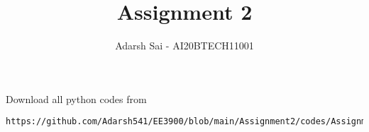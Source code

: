 \documentclass[journal,12pt,twocolumn]{IEEEtran}
\DeclareMathOperator*{\Res}{Res}
\begin{document}
\newcommand{\BEQA}{\begin{eqnarray}}
\newcommand{\EEQA}{\end{eqnarray}}
\newcommand{\define}{\stackrel{\triangle}{=}}

\raggedbottom
\setlength{\parindent}{0pt}
\providecommand{\mbf}{\mathbf}
\providecommand{\pr}[1]{\ensuremath{\Pr\left(#1\right)}}
\providecommand{\qfunc}[1]{\ensuremath{Q\left(#1\right)}}
\providecommand{\sbrak}[1]{\ensuremath{{}\left[#1\right]}}
\providecommand{\lsbrak}[1]{\ensuremath{{}\left[#1\right.}}
\providecommand{\rsbrak}[1]{\ensuremath{{}\left.#1\right]}}
\providecommand{\brak}[1]{\ensuremath{\left(#1\right)}}
\providecommand{\lbrak}[1]{\ensuremath{\left(#1\right.}}
\providecommand{\rbrak}[1]{\ensuremath{\left.#1\right)}}
\providecommand{\cbrak}[1]{\ensuremath{\left\{#1\right\}}}
\providecommand{\lcbrak}[1]{\ensuremath{\left\{#1\right.}}
\providecommand{\rcbrak}[1]{\ensuremath{\left.#1\right\}}}
\theoremstyle{remark}
\newtheorem{rem}{Remark}
\newcommand{\sgn}{\mathop{\mathrm{sgn}}}
\providecommand{\abs}[1]{\vert#1\vert}
\providecommand{\res}[1]{\Res\displaylimits_{#1}} 
\providecommand{\norm}[1]{\lVert#1\rVert}
\providecommand{\mtx}[1]{\mathbf{#1}}
\providecommand{\mean}[1]{E[ #1 ]}
\providecommand{\fourier}{\overset{\mathcal{F}}{ \rightleftharpoons}}
\providecommand{\system}{\overset{\mathcal{H}}{ \longleftrightarrow}}
\newcommand{\solution}{\noindent \textbf{Solution: }}
\newcommand{\cosec}{\,\text{cosec}\,}
\providecommand{\dec}[2]{\ensuremath{\overset{#1}{\underset{#2}{\gtrless}}}}
\newcommand{\myvec}[1]{\ensuremath{\begin{pmatrix}#1\end{pmatrix}}}
\newcommand{\mydet}[1]{\ensuremath{\begin{vmatrix}#1\end{vmatrix}}}
\makeatletter
{}
\makeatother
\let\StandardTheFigure\thefigure
\let\vec\mathbf
\renewcommand{\thefigure}{\theproblem}
\def\putbox#1#2#3{\makebox[0in][l]{\makebox[#1][l]{}\raisebox{\baselineskip}[0in][0in]{\raisebox{#2}[0in][0in]{#3}}}}
     \def\rightbox#1{\makebox[0in][r]{#1}}
     \def\centbox#1{\makebox[0in]{#1}}
     \def\topbox#1{\raisebox{-\baselineskip}[0in][0in]{#1}}
     \def\midbox#1{\raisebox{-0.5\baselineskip}[0in][0in]{#1}}
\vspace{3cm}
\title{Assignment 2}
\author{Adarsh Sai - AI20BTECH11001}
\maketitle
\newpage
\bigskip
\renewcommand{\thefigure}{\theenumi}
\renewcommand{\thetable}{\theenumi}
Download all python codes from 
\begin{lstlisting}
https://github.com/Adarsh541/EE3900/blob/main/Assignment2/codes/Assignment2.py
\end{lstlisting}
\end{document}
